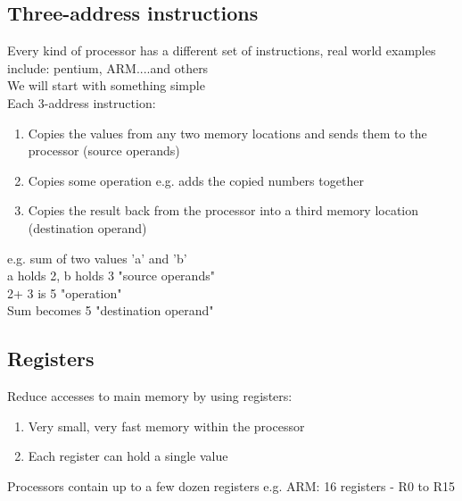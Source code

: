 \documentclass{article}
\begin{document}
\subsection{Three-address instructions}
Every kind of processor has a different set of instructions, real world examples include: pentium, ARM....and others\\
We will start with something simple\\
Each 3-address instruction:
\begin{enumerate}
\item Copies the values from any two memory locations and sends them to the processor (source operands)
\item Copies some operation e.g. adds the copied numbers together
\item Copies the result back from the processor into a third memory location (destination operand)
\end{enumerate}
e.g. sum of two values 'a' and 'b'\\
a holds 2, b holds 3 "source operands"\\
2+ 3 is 5 "operation"\\
Sum becomes 5 "destination operand"

\subsection{Registers}
Reduce accesses to main memory by using registers:
\begin{enumerate}
\item Very small, very fast memory within the processor
\item Each register can hold a single value
\end{enumerate}
Processors contain up to a few dozen registers e.g. ARM: 16 registers - R0 to R15
\end{document}
